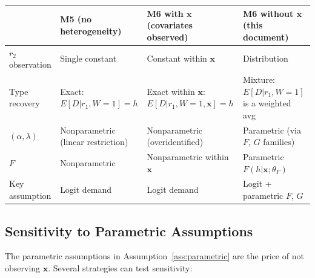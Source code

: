 \documentclass[12pt]{article}
\theoremstyle{plain}
\theoremstyle{plain}
\theoremstyle{definition}  %
\theoremstyle{remark}  %
\begin{document}
\begin{center}
\renewcommand{\arraystretch}{1.5}
\begin{tabular}{p{2.5cm}p{3.5cm}p{3.5cm}p{3.5cm}}
\toprule
& \textbf{M5} \newline (no heterogeneity) & \textbf{M6 with $\mathbf{x}$} \newline (covariates observed) & \textbf{M6 without $\mathbf{x}$} \newline (this document) \\
\midrule
$r_2$ observation & Single constant & Constant within $\mathbf{x}$ & Distribution \\[2pt]
Type recovery & Exact: \newline $E[D|r_1, W\!=\!1] = h$ & Exact within $\mathbf{x}$: \newline $E[D|r_1, W\!=\!1, \mathbf{x}] = h$ & Mixture: \newline $E[D|r_1, W\!=\!1]$ is a weighted avg \\[2pt]
$(\alpha, \lambda)$ & Nonparametric \newline (linear restriction) & Nonparametric \newline (overidentified) & Parametric \newline (via $F$, $G$ families) \\[2pt]
$F$ & Nonparametric & Nonparametric within $\mathbf{x}$ & Parametric $F(h|\mathbf{x};\theta_F)$ \\[2pt]
Key assumption & Logit demand & Logit demand & Logit + parametric $F$, $G$ \\
\bottomrule
\end{tabular}
\end{center}

\subsection{Sensitivity to Parametric Assumptions}

The parametric assumptions in Assumption~\ref{ass:parametric} are the price of not observing $\mathbf{x}$.  Several strategies can test sensitivity:
\end{document}
